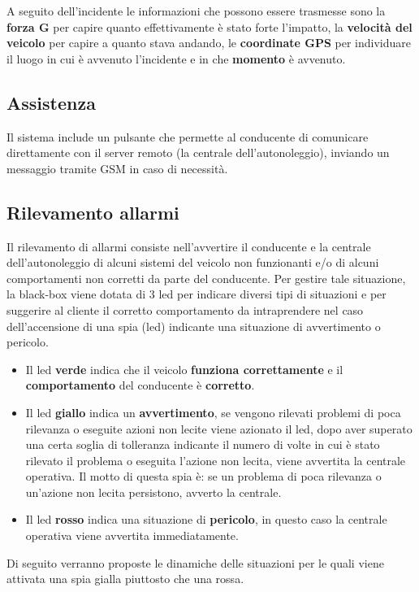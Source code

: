 \documentclass[12pt, a4paper, italian]{report}
\numberwithin{figure}{chapter}
\numberwithin{table}{chapter}
\begin{document}
A seguito dell'incidente le informazioni che possono essere trasmesse sono la \textbf{forza G} per capire quanto effettivamente è stato forte l'impatto, la \textbf{velocità del veicolo} per capire a quanto stava andando, le \textbf{coordinate GPS} per individuare il luogo in cui è avvenuto l'incidente e in che \textbf{momento} è avvenuto.

\subsection{Assistenza}
Il sistema include un pulsante che permette al conducente di comunicare direttamente con il server remoto (la centrale dell'autonoleggio), inviando un messaggio tramite GSM in caso di necessità.
\subsection{Rilevamento allarmi}
Il rilevamento di allarmi consiste nell'avvertire il conducente e la centrale dell'autonoleggio di alcuni sistemi del veicolo non funzionanti e/o di alcuni comportamenti non corretti da parte del conducente. Per gestire tale situazione, la black-box viene dotata di 3 led per indicare diversi tipi di situazioni e per suggerire al cliente il corretto comportamento da intraprendere nel caso dell'accensione di una spia (led) indicante una situazione di avvertimento o pericolo. 
\begin{itemize}
    \item Il led \textbf{verde} indica che il veicolo \textbf{funziona correttamente} e il \textbf{comportamento} del conducente è \textbf{corretto}.
    \item Il led \textbf{giallo} indica un \textbf{avvertimento}, se vengono rilevati problemi di poca rilevanza o eseguite azioni non lecite viene azionato il led, dopo aver superato una certa soglia di tolleranza indicante il numero di volte in cui è stato rilevato il problema o eseguita l'azione non lecita, viene avvertita la centrale operativa. Il motto di questa spia è: se un problema di poca rilevanza o un'azione non lecita persistono, avverto la centrale.
    \item Il led \textbf{rosso} indica una situazione di \textbf{pericolo}, in questo caso la centrale operativa viene avvertita immediatamente.
\end{itemize}

Di seguito verranno proposte le dinamiche delle situazioni per le quali viene attivata una spia gialla piuttosto che una rossa.
\end{document}
